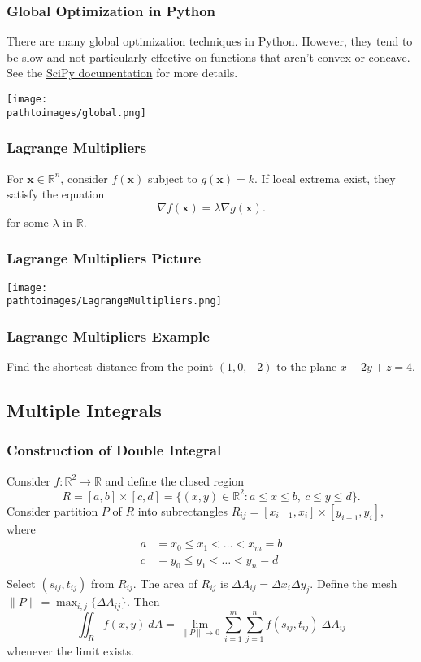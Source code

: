 \documentclass{beamer}
\newcommand{\pathtoimages}{/Users/charlesrambo/Desktop/Bootcamp24/Images}
\begin{document}
\begin{frame}
\frametitle{Global Optimization in Python}
\tiny
There are many global optimization techniques in Python. However, they tend to be slow and not particularly effective on functions that aren't convex or concave. See the \href{https://docs.scipy.org/doc/scipy/reference/optimize.html}{SciPy documentation} for more details. 
\begin{center}
\texttt{[image: \\pathtoimages/global.png]}
\end{center}
\end{frame}

\begin{frame}
\frametitle{Lagrange Multipliers}
For ${\boldsymbol x}\in \mathbb{R}^n$, consider $f({\boldsymbol x})$ subject to $g({\boldsymbol x}) = k$. If local extrema exist, they satisfy the equation
$$
\nabla f({\boldsymbol x}) = \lambda \nabla g({\boldsymbol x}).
$$
for some $\lambda$ in $\mathbb{R}$.
\end{frame}


\begin{frame}
\frametitle{Lagrange Multipliers Picture}
\begin{center}
\texttt{[image: \\pathtoimages/LagrangeMultipliers.png]}
\end{center}
\end{frame}

\begin{frame}[t]
\frametitle{Lagrange Multipliers Example}
\begin{Example}
Find the shortest distance from the point $(1, 0, -2)$ to the plane $x + 2y + z = 4$.
\end{Example}
\end{frame}

\subsection{Multiple Integrals}

\begin{frame}
\frametitle{Construction of Double Integral}
\tiny
Consider $f:\mathbb{R}^2\to\mathbb{R}$ and define the closed region
$$
R = [a, b]\times [c, d] = \{(x, y)\in\mathbb{R}^2: a\leq x\leq b,\ c\leq y\leq d\}.
$$
Consider partition $P$ of $R$ into subrectangles $R_{ij} = [x_{i - 1}, x_i]\times [y_{i - 1}, y_i]$, where
\begin{align*}
a &= x_0 \leq x_1 < \ldots < x_m = b\\
c &= y_0 \leq y_1 < \ldots < y_n = d\\
\end{align*}
Select $(s_{ij}, t_{ij})$ from $R_{ij}$. The area of $R_{ij}$ is $\Delta A_{ij} = \Delta x_i\Delta y_j$. Define the mesh $\|P\| = \max_{i, j}\{\Delta A_{ij}\}$. Then
$$
\iint_R f(x, y)\ dA = \lim_{\|P\|\to 0} \sum_{i = 1}^m\sum_{j = 1}^n f(s_{ij}, t_{ij})\ \Delta A_{ij}
$$
whenever the limit exists.
\end{frame}
\end{document}
